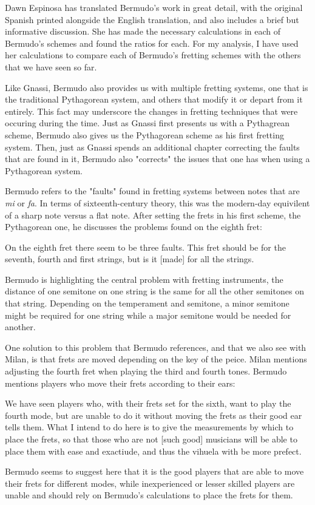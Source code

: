 Dawn Espinosa has translated Bermudo's work in great detail, with the original Spanish printed alongside
the English translation, and also includes a brief but informative discussion.  She has made
the necessary calculations in each of Bermudo's schemes and found the ratios for each.
For my analysis, I have used her calculations to compare each of Bermudo's fretting schemes
with the others that we have seen so far.

Like Gnassi, Bermudo also provides us with multiple fretting systems, one that is the traditional
Pythagorean system, and others that modify it or depart from it entirely.  This fact
may underscore the changes in fretting techniques that were occuring during the time.  Just as
Gnassi first presents us with a Pythagrean scheme, Bermudo also gives us the Pythagorean scheme
as his first fretting system.  Then, just as Gnassi spends an additional chapter correcting
the faults that are found in it, Bermudo also "corrects" the issues that one has when using
a Pythagorean system.

Bermudo refers to the "faults" found in fretting systems between notes that are \textit{mi} or
\textit{fa}.  In terms of sixteenth-century theory, this was the modern-day
equivilent of a sharp note versus a flat note.  After setting the frets in his first scheme,
the Pythagorean one, he discusses the problems found on the eighth fret:
\begin{blocks}
On the eighth fret there seem to be three faults.  This fret should be  for the
seventh, fourth and first strings, but is it [made]  for all the strings.
\autocite[95]{DE:1}
\end{blocks}
Bermudo is highlighting the central problem with fretting instruments, the distance of one
semitone on one string is the same for all the other semitones on that string.  Depending
on the temperament and semitone, a minor semitone might be required for one string while
a major semitone would be needed for another.

One solution to this problem that Bermudo references, and that we also see with Milan, is
that frets are moved depending on the key of the peice.  Milan mentions adjusting the
fourth fret when playing the third and fourth tones.  Bermudo mentions players who move their
frets according to their ears:
\begin{blocks}
We have seen players who, with their frets set for the sixth, want to play the fourth mode,
but are unable to do it without moving the frets as their good ear tells them.  What I intend
to do here is to give the measurements by which to place the frets, so that those who are not
[such good] musicians will be able to place them with ease and exactiude, and thus the vihuela
with be more prefect.
\autocite[78]{DE:1}
\end{blocks}
Bermudo seems to suggest here that it is the good players that are able to move their frets
for different modes, while inexperienced or lesser skilled players are unable and should
rely on Bermudo's calculations to place the frets for them.

